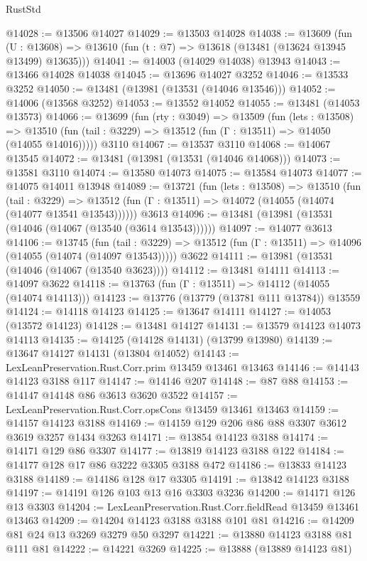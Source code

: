 \begin{lexlean}{RustStd}
\begin{coremodule}
@14028 := @13506 @14027
@14029 := @13503 @14028
@14038 := @13609
    (fun (U : @13608) => @13610 (fun (t : @7) => @13618 (@13481 (@13624 @13945 @13499) @13635)))
@14041 := @14003 (@14029 @14038) @13943
@14043 := @13466 @14028 @14038
@14045 := @13696 @14027 @3252
@14046 := @13533 @3252
@14050 := @13481 (@13981 (@13531 (@14046 @13546)))
@14052 := @14006 (@13568 @3252)
@14053 := @13552 @14052
@14055 := @13481 (@14053 @13573)
@14066 := @13699
    (fun (rty : @3049) =>
    @13509
      (fun (lets : @13508) =>
      @13510 (fun (tail : @3229) => @13512 (fun (Γ : @13511) => @14050 (@14055 @14016)))))
    @3110
@14067 := @13537 @3110
@14068 := @14067 @13545
@14072 := @13481 (@13981 (@13531 (@14046 @14068)))
@14073 := @13581 @3110
@14074 := @13580 @14073
@14075 := @13584 @14073
@14077 := @14075 @14011 @13948
@14089 := @13721
    (fun (lets : @13508) =>
    @13510
      (fun (tail : @3229) =>
      @13512 (fun (Γ : @13511) => @14072 (@14055 (@14074 (@14077 @13541 @13543))))))
    @3613
@14096 := @13481 (@13981 (@13531 (@14046 (@14067 (@13540 (@3614 @13543))))))
@14097 := @14077 @3613
@14106 := @13745
    (fun (tail : @3229) => @13512 (fun (Γ : @13511) => @14096 (@14055 (@14074 (@14097 @13543)))))
    @3622
@14111 := @13981 (@13531 (@14046 (@14067 (@13540 @3623))))
@14112 := @13481 @14111
@14113 := @14097 @3622
@14118 := @13763 (fun (Γ : @13511) => @14112 (@14055 (@14074 @14113)))
@14123 := @13776 (@13779 (@13781 @111 @13784)) @13559
@14124 := @14118 @14123
@14125 := @13647 @14111
@14127 := @14053 (@13572 @14123)
@14128 := @13481 @14127
@14131 := @13579 @14123 @14073 @14113
@14135 := @14125 (@14128 @14131) (@13799 @13980)
@14139 := @13647 @14127 @14131 (@13804 @14052)
@14143 := LexLeanPreservation.Rust.Corr.prim @13459 @13461 @13463
@14146 := @14143 @14123 @3188 @117
@14147 := @14146 @207
@14148 := @87 @88
@14153 := @14147 @14148 @86 @3613 @3620 @3522
@14157 := LexLeanPreservation.Rust.Corr.opsCons @13459 @13461 @13463
@14159 := @14157 @14123 @3188
@14169 := @14159 @129 @206 @86 @88 @3307 @3612 @3619 @3257 @1434 @3263
@14171 := @13854 @14123 @3188
@14174 := @14171 @129 @86 @3307
@14177 := @13819 @14123 @3188 @122
@14184 := @14177 @128 @17 @86 @3222 @3305 @3188 @472
@14186 := @13833 @14123 @3188
@14189 := @14186 @128 @17 @3305
@14191 := @13842 @14123 @3188
@14197 := @14191 @126 @103 @13 @16 @3303 @3236
@14200 := @14171 @126 @13 @3303
@14204 := LexLeanPreservation.Rust.Corr.fieldRead @13459 @13461 @13463
@14209 := @14204 @14123 @3188 @3188 @101 @81
@14216 := @14209 @81 @24 @13 @3269 @3279 @50 @3297
@14221 := @13880 @14123 @3188 @81 @111 @81
@14222 := @14221 @3269
@14225 := @13888 (@13889 @14123 @81)

\end{coremodule}
\end{lexlean}
